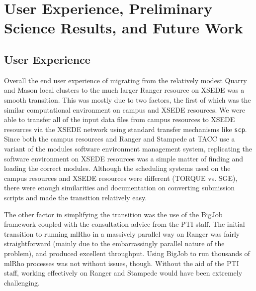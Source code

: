 \documentclass{sig-alternate}
\newcommand{\abhi}[1]{ {\textcolor{red} { ***Abhinav: #1 }}}
\newcommand{\abhi}[1]{ {}}
\begin{document}


\section{User Experience, Preliminary Science Results, and Future Work}\label{sec:results}
\subsection{User Experience}
Overall the end user experience of migrating from the relatively modest Quarry and Mason local clusters to the
much larger Ranger resource on XSEDE was a smooth transition. This was mostly due to two factors, the
first of which was the similar computational environment on campus and XSEDE resources. We were able to
transfer all of the input data files from campus resources to XSEDE resources via the
XSEDE network using standard transfer mechanisms like \texttt{scp}. Since both the campus resources and Ranger and
Stampede at TACC use a variant of the modules software environment management system, replicating the software
environment on XSEDE resources was a simple matter of finding and loading the correct modules. Although the
scheduling systems used on the campus resources and XSEDE resources were different (TORQUE vs. SGE), there were
enough similarities and documentation on converting submission scripts and made the transition relatively
easy. 
 
The other factor in simplifying  the transition was the use of the BigJob framework coupled with the
consultation advice from the PTI staff. The initial transition to running mlRho in a massively parallel
way on Ranger was fairly straightforward (mainly due to the embarrassingly parallel nature of the problem),
and produced excellent throughput. Using BigJob to run thousands of mlRho processes was not without
issues, though. Without the aid of the PTI staff,
working effectively on Ranger and Stampede would have been extremely challenging. 
\end{document}
